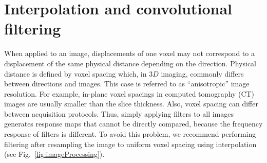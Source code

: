 \documentclass[fleqn,a4paper,oneside,openany]{book}
\begin{document}
\section{Interpolation and convolutional filtering}\label{sec:interpolationAndFiltering}
%

When applied to an image, displacements of one voxel may not correspond to a displacement of the same physical distance depending on the direction. 
Physical distance is defined by voxel spacing which, in 3$D$ imaging, commonly differs between directions and images. This case is referred to as ``anisotropic'' image resolution. For example, in-plane voxel spacings in computed tomography (CT) images are usually smaller than the slice thickness. Also, voxel spacing can differ between acquisition protocols. Thus, simply applying filters to all images generates response maps that cannot be directly compared, because the frequency response of filters is different. To avoid this problem, we recommend performing filtering after resampling the image to uniform voxel spacing using interpolation (see Fig.~\ref{fig:imageProcessing}).
\end{document}
